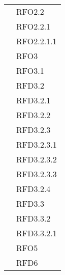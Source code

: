 \begin{longtable}{|>{\centering}m{10cm}|m{3cm}<{\centering}|}
& RFO2.2\\
& RFO2.2.1\\
& RFO2.2.1.1\\
& RFO3\\
& RFO3.1\\
& RFD3.2\\
& RFD3.2.1\\
& RFD3.2.2\\
& RFD3.2.3\\
& RFD3.2.3.1\\
& RFD3.2.3.2\\
& RFD3.2.3.3\\
& RFD3.2.4\\
& RFD3.3\\
& RFD3.3.2\\
& RFD3.3.2.1\\
& RFO5\\
& RFD6\\ \hline


\end{longtable}

